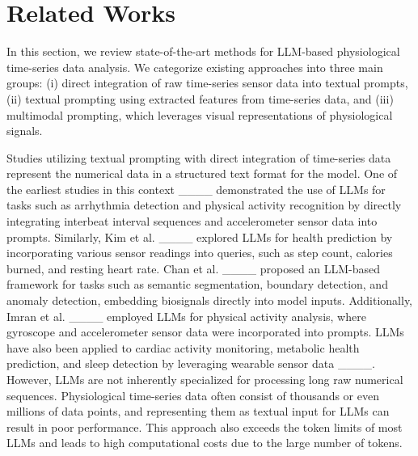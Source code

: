 \section{Related Works}
In this section, we review state-of-the-art methods for LLM-based physiological time-series data analysis. We categorize existing approaches into three main groups: (i) direct integration of raw time-series sensor data into textual prompts, (ii) textual prompting using extracted features from time-series data, and (iii) multimodal prompting, which leverages visual representations of physiological signals. 

Studies utilizing textual prompting with direct integration of time-series data represent the numerical data in a structured text format for the model. One of the earliest studies in this context ____ demonstrated the use of LLMs for tasks such as arrhythmia detection and physical activity recognition by directly integrating interbeat interval sequences and accelerometer sensor data into prompts. Similarly, Kim et al. ____ explored LLMs for health prediction by incorporating various sensor readings into queries, such as step count, calories burned, and resting heart rate. Chan et al. ____ proposed an LLM-based framework for tasks such as semantic segmentation, boundary detection, and anomaly detection, embedding biosignals directly into model inputs. Additionally, Imran et al. ____ employed LLMs for physical activity analysis, where gyroscope and accelerometer sensor data were incorporated into prompts. LLMs have also been applied to cardiac activity monitoring, metabolic health prediction, and sleep detection by leveraging wearable sensor data  ____. However, LLMs are not inherently specialized for processing long raw numerical sequences. Physiological time-series data often consist of thousands or even millions of data points, and representing them as textual input for LLMs can result in poor performance. This approach also exceeds the token limits of most LLMs and leads to high computational costs due to the large number of tokens.


